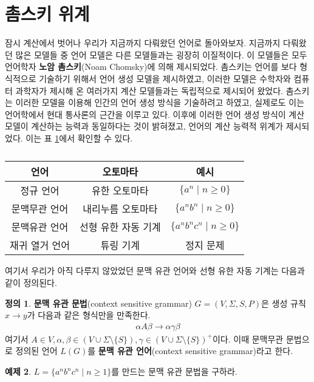 \documentclass[b5paper, 11pt]{book}
\theoremstyle{definition}
\newtheorem{defn}{정의}[chapter]
\newtheorem{ex}[defn]{예제}
\begin{document}
\section{촘스키 위계}
잠시 계산에서 벗어나 우리가 지금까지 다뤄왔던 언어로 돌아와보자. 지금까지 다뤄왔던 많은 모델들 중
언어 모델은 다른 모델들과는 굉장히 이질적이다. 이 모델들은 모두 
언어학자 \textbf{노암 촘스키}(Noam Chomsky)에 의해 제시되었다. 촘스키는 언어를 보다 형식적으로
기술하기 위해서 언어 생성 모델을 제시하였고, 이러한 모델은 수학자와 컴퓨터 과학자가 제시해 온 여러가지 계산 모델들과는 독립적으로 제시되어 왔었다. 촘스키는 이러한 모델을 이용해 인간의 언어 생성 방식을 기술하려고 하였고, 실제로도 이는 언어학에서 현대 통사론의 근간을 이루고 있다. 이후에 이러한 언어 생성 방식이 계산 모델이 계산하는 능력과 동일하다는 것이 밝혀졌고, 언어의 계산 능력적 위계가 제시되었다. 이는 표 \ref{chomsky hierarchy}에서 확인할 수 있다.
\begin{table}[h]
    \centering
    \begin{tabular}{|c|c|c|}
    \hline
    \textbf{언어} & \textbf{오토마타} & \textbf{예시} \\ \hline
    정규 언어       & 유한 오토마타       &   $\{ a^n \;\vert\; n\ge 0\}$    \\ \hline
    문맥무관 언어    & 내리누름 오토마타     & $\{ a^n b^n \;\vert\; n\ge 0\}$    \\ \hline
    문맥유관 언어    & 선형 유한 자동 기계   & $\{ a^n b^n c^n \;\vert\; n\ge 0\}$    \\ \hline
    재귀 열거 언어    & 튜링 기계         & 정지 문제  \\ \hline
    \end{tabular}
    \caption{}
    \label{chomsky hierarchy}
\end{table}
여기서 우리가 아직 다루지 않았었던 문맥 유관 언어와 선형 유한 자동 기계는 다음과 같이 정의된다. 
\begin{defn}
    \textbf{문맥 유관 문법}(context sensitive grammar) $G = (V, \Sigma, S, P)$은 생성 규칙
    $x \rightarrow y$가 다음과 같은 형식만을 만족한다.
    \begin{align*}
        \alpha A \beta \rightarrow \alpha \gamma \beta
    \end{align*}
    여기서 $A \in V, \alpha, \beta \in (V \cup \Sigma \setminus \{S\}), 
    \gamma \in (V \cup \Sigma \setminus \{S\})^+$이다.
    이때 문맥무관 문법으로 정의된 언어 $L(G)$를 \textbf{문맥 유관 언어}(context sensitive grammar)라고
    한다.
\end{defn}
\begin{ex}
    $L = \{ a^n b^n c^n \;\vert\; n \ge 1\}$를 만드는 문맥 유관 문법을 구하라. 
\end{ex}
\end{document}
